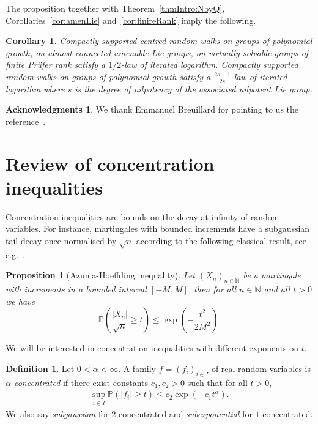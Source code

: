 \documentclass[11pt,leqno]{article}
\theoremstyle{plain}
\newtheorem{corollary}[theorem]{Corollary}
\newtheorem{proposition}[theorem]{Proposition}
\theoremstyle{definition}
\newtheorem{definition}[theorem]{Definition}
\newtheorem*{ack}{Acknowledgments}
\theoremstyle{remark}
\numberwithin{equation}{section}
\begin{document}
The proposition together with Theorem~\ref{thmIntro:NbyQ}, Corollaries~\ref{cor:amenLie} and~\ref{cor:finireRank} imply the following.

\begin{corollary}
Compactly supported centred random walks on groups of polynomial growth, on almost connected amenable Lie groups, on virtually solvable groups of finite Prüfer rank satisfy a $1/2$-law of iterated logarithm. Compactly supported random walks on groups of polynomial growth satisfy a $\frac{2s-1}{2s}$-law of iterated logarithm where $s$ is the degree of nilpotency of the associated nilpotent Lie group.
\end{corollary}

\begin{ack} We thank Emmanuel Breuillard for pointing to us the reference~\cite{Losert}.
	\end{ack}

\section{Review of concentration inequalities}
\label{sec:prelimConcentration} 

Concentration inequalities are bounds on the decay at infinity of random variables. For instance, martingales with bounded increments have a subgaussian tail decay once normalised by $\sqrt{n}$ according to the following classical result, see e.g.~\cite[Chapter 3]{BDR}.

\begin{proposition}[Azuma-Hoeffding inequality]\label{prop:AH}
Let $(X_n)_{n \in \mathbb{N}}$ be a martingale with increments in a bounded interval $[-M,M]$, then for all $n \in \mathbb{N}$ and all $t>0$ we have
\[
\mathbb{P}\left(\frac{|X_n|}{\sqrt{n}} \ge t\right) \le \exp\left(-\frac{t^2}{2M^2}\right).
\]
\end{proposition}


We will be interested in concentration inequalities with different exponents on $t$.

\begin{definition}\label{def-concentration}
Let
$0< \alpha<\infty$. A family $f=(f_{i})_{i\in I}$
of real random variables is \emph{$\alpha$-concentrated} if there exist constants $c_1,c_2>0$ such that for all $t>0$, 
\begin{align}\label{def:concentration}
\sup_{i\in I}\mathbb{P}(|f_{i}|\geq t)\leq c_2\exp(-c_1t^{\alpha}).
\end{align}
We also say \emph{subgaussian} for $2$-concentrated and \emph{subexponential} for $1$-concentrated.
\end{definition}
\end{document}
